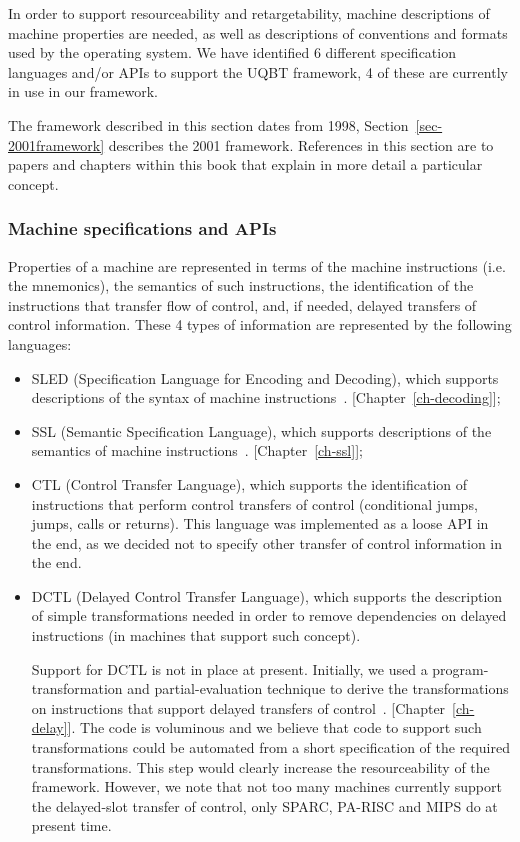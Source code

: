 In order to support resourceability and retargetability, 
machine descriptions of machine properties are needed, 
as well as descriptions of conventions and formats used by 
the operating system.  We have identified 6 different specification 
languages and/or APIs to support the UQBT framework, 4 of these are 
currently in use in our framework. 

The framework described in this section dates from 1998, 
Section~\ref{sec-2001framework} describes the 2001 framework. 
References in this section are to papers and chapters within 
this book that explain in more detail a particular concept. 


\subsubsection*{Machine specifications and APIs} 
Properties of a machine are represented in terms of the machine 
instructions (i.e. the mnemonics), the semantics of such instructions, 
the identification of the instructions that transfer flow of control, 
and, if needed, delayed transfers of control information.  
These 4 types of information are represented by the following 
languages: 

  \begin{itemize}
  \item SLED (Specification Language for Encoding and Decoding), 
	which supports descriptions of the syntax of machine 
	instructions~\cite{Rams97}.  [Chapter~\ref{ch-decoding}];

  \item SSL (Semantic Specification Language), which supports 
	descriptions of the semantics of machine 
	instructions~\cite{Cifu98c}.  [Chapter~\ref{ch-ssl}]; 

  \item CTL (Control Transfer Language), which supports the 
	identification of instructions that perform control 
	transfers of control (conditional jumps, jumps, calls or 
	returns). This language was implemented as a loose API in the
	end, as we decided not to specify other transfer of control 
	information in the end.  

  \item DCTL (Delayed Control Transfer Language), which supports 
	the description of simple transformations needed in 
	order to remove dependencies on delayed instructions (in 
	machines that support such concept).  

    Support for DCTL is not in place at present.  Initially, we used 
    a program-transformation and partial-evaluation technique to derive 
    the transformations on instructions that support delayed transfers of 
    control~\cite{Cifu98i}.  [Chapter~\ref{ch-delay}].
    The code is voluminous and we believe that code to support such 
    transformations could be automated from a short specification 
    of the required transformations.  This step would clearly increase 
    the resourceability of the framework.  However, we note that not 
    too many machines currently support the delayed-slot transfer of 
    control, only SPARC, PA-RISC and MIPS do at present time.

  \end{itemize}


